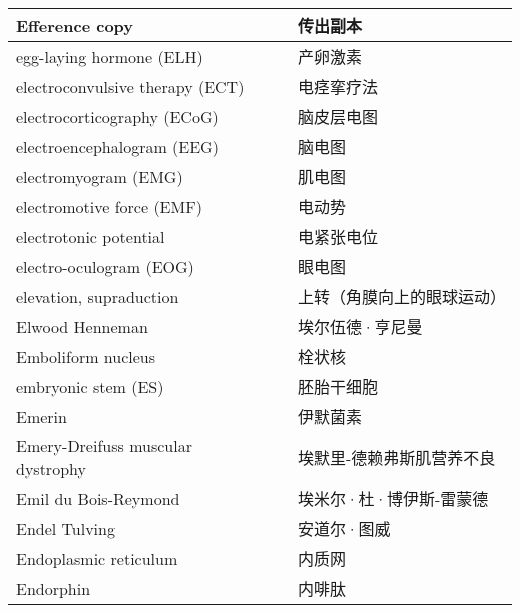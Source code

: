 \begin{longtable}{lll}
	\midrule
	Efference copy     &&  传出副本  \\
	
	\midrule
	egg-laying hormone (ELH)    &&  产卵激素  \\
	
	\midrule
	electroconvulsive therapy (ECT)     &&  电痉挛疗法  \\
	
	\midrule
	electrocorticography (ECoG)     &&  脑皮层电图  \\
	
	\midrule
	electroencephalogram (EEG)   &&  脑电图  \\
	
	\midrule
	electromyogram (EMG)     &&  肌电图  \\
	
	\midrule
	electromotive force (EMF)     &&  电动势  \\
	
	\midrule
	electrotonic potential     &&  电紧张电位  \\
	
	\midrule
	electro-oculogram (EOG)     &&  眼电图  \\
	
	\midrule
	elevation, supraduction     &&  上转（角膜向上的眼球运动）  \\
	
	\midrule
	Elwood Henneman     &&  埃尔伍德·亨尼曼  \\
	
	\midrule
	Emboliform nucleus     &&  栓状核  \\
	
	\midrule
	embryonic stem  (ES)   &&  胚胎干细胞  \\
	
	\midrule
	Emerin   &&  伊默菌素  \\
	
	\midrule
	Emery-Dreifuss muscular dystrophy   &&  埃默里-德赖弗斯肌营养不良  \\
	
	\midrule
	Emil du	Bois-Reymond   &&  埃米尔·杜·博伊斯-雷蒙德  \\
	
	\midrule
	Endel Tulving     &&  安道尔·图威  \\
	
	\midrule
	Endoplasmic reticulum     &&  内质网  \\
	
	\midrule
	Endorphin     &&  内啡肽  \\
	

\end{longtable}
